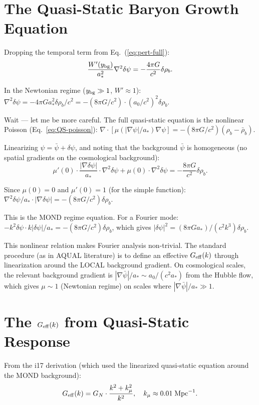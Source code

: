 \documentclass[11pt]{article}
\newcommand{\Geff}{G_{\rm eff}}
\newcommand{\kmu}{k_\mu}
\begin{document}
\section{The Quasi-Static Baryon Growth Equation}

Dropping the temporal term from Eq.~(\ref{eq:pert-full}):
\begin{equation}
\frac{W'(y_{\rm bg})}{a_*^2} \nabla^2 \delta\psi
= -\frac{4\pi G}{c^2} \delta\rho_b.
\end{equation}

In the Newtonian regime ($y_{\rm bg} \gg 1$, $W' \approx 1$):
$\nabla^2 \delta\psi = -4\pi G a_*^2 \delta\rho_b/c^2
= -(8\pi G/c^2) \cdot (a_0/c^2)^2 \delta\rho_b$.

Wait --- let me be more careful. The full quasi-static equation is
the nonlinear Poisson (Eq.~\ref{eq:QS-poisson}):
$\nabla \cdot [\mu(|\nabla\psi|/a_*) \nabla\psi]
= -(8\pi G/c^2)(\rho_b - \bar\rho_b)$.

Linearizing $\psi = \bar\psi + \delta\psi$, and noting that the
background $\bar\psi$ is homogeneous (no spatial gradients on the
cosmological background):
\begin{equation}
\mu'(0) \cdot \frac{|\nabla\delta\psi|}{a_*} \cdot \nabla^2\delta\psi
+ \mu(0) \cdot \nabla^2\delta\psi = -\frac{8\pi G}{c^2}\delta\rho_b.
\end{equation}

Since $\mu(0) = 0$ and $\mu'(0) = 1$ (for the simple function):
$\nabla^2 \delta\psi / a_* \cdot |\nabla\delta\psi| = -(8\pi G/c^2)\delta\rho_b$.

This is the MOND regime equation. For a Fourier mode:
$-k^2 \delta\psi \cdot k|\delta\psi|/a_* = -(8\pi G/c^2)\delta\rho_b$,
which gives $|\delta\psi|^2 = (8\pi G a_*)/(c^2 k^3) \delta\rho_b$.

This nonlinear relation makes Fourier analysis non-trivial. The
standard procedure (as in AQUAL literature) is to define an effective
$\Geff(k)$ through linearization around the LOCAL background gradient.
On cosmological scales, the relevant background gradient is
$|\nabla\bar\psi|/a_* \sim a_0/(c^2 a_*)$ from the Hubble flow,
which gives $\mu \sim 1$ (Newtonian regime) on scales where
$|\nabla\bar\psi|/a_* \gg 1$.

\section{The $\Geff(k)$ from Quasi-Static Response}

From the i17 derivation (which used the linearized quasi-static
equation around the MOND background):
\begin{equation}
\Geff(k) = G_N \cdot \frac{k^2 + \kmu^2}{k^2},
\quad \kmu \approx 0.01\;\text{Mpc}^{-1}.
\end{equation}
\end{document}
